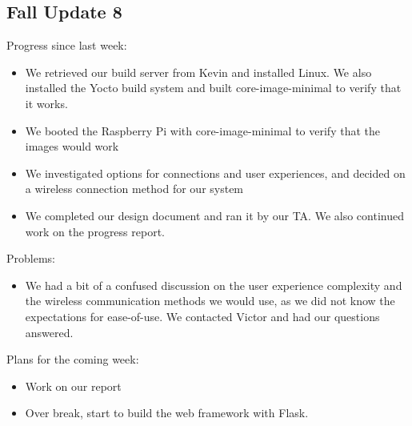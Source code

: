 \subsection{Fall Update 8}
Progress since last week:
\begin{itemize}
   \item We retrieved our build server from Kevin and installed Linux. We also installed the Yocto build system and built core-image-minimal to verify that it works.
   \item We booted the Raspberry Pi with core-image-minimal to verify that the images would work
   \item We investigated options for connections and user experiences, and decided on a wireless connection method for our system
   \item We completed our design document and ran it by our TA. We also continued work on the progress report.
\end{itemize}
Problems:
\begin{itemize}
   \item We had a bit of a confused discussion on the user experience complexity and the wireless communication methods we would use, as we did not know the expectations for ease-of-use. We contacted Victor and had our questions answered.
\end{itemize}
Plans for the coming week:
\begin{itemize}
   \item Work on our report
   \item Over break, start to build the web framework with Flask.
\end{itemize}
